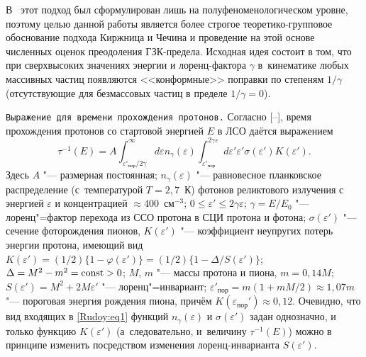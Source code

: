В~\cite{Rudoy:KIRSHNIZ} этот подход был сформулирован лишь на полуфеноменологическом уровне, поэтому целью данной работы является
более строгое теоретико-групповое обоснование подхода Киржница и Чечина \cite{Rudoy:KIRSHNIZ} и проведение на этой основе
численных оценок преодоления ГЗК-предела. Исходная идея состоит в том, что при сверхвысоких значениях энергии и лоренц-фактора
$\gamma$ в~кинематике любых массивных частиц появляются <<конформные>> поправки по степеням $1/\gamma$ (отсутствующие для
безмассовых частиц в пределе $1/\gamma=0$).

\smallskip

{\tt Выражение для времени прохождения протонов.} 
Согласно [--], время \linebreak прохождения
протонов со стартовой энергией $E$ в ЛСО даётся \mbox{выражением}
\begin{equation}
\tau^{-1}(E)=A\int^{\infty}_{\varepsilon'_{\textrm{пор}}/2\gamma} d\varepsilon n_\gamma(\varepsilon)
\int^{2\gamma\varepsilon}_{\varepsilon'_{\textrm{пор}}} d\varepsilon'\varepsilon'\sigma(\varepsilon')K(\varepsilon').
\label{Rudoy:eq1}
\end{equation}
Здесь $A$ "--- размерная постоянная; $n_\gamma(\varepsilon)$ "--- равновесное планковское распределение (с~температурой $T=2,7$~К) фотонов реликтового излучения с энергией $\varepsilon$ и концентрацией $\approx400$~см$^{-3}$;
$0\leq\varepsilon'\leq2\gamma\varepsilon$; 
$\gamma=E/E_0$ "--- лоренц"=фактор перехода из ССО протона в СЦИ протона и фотона;
$\sigma(\varepsilon')$ "--- сечение фоторождения пионов, $K(\varepsilon')$ "--- коэффициент неупругих потерь энергии протона,
имеющий вид $K(\varepsilon')=(1/2)\{1 - \varphi(\varepsilon')\}=(1/2)\{1 - \Delta/S(\varepsilon')\}$; $\Delta={M^2-m^2}=\rm{ const
}>0$; $M$, $m$ "--- массы протона и пиона, $m=0,14M$; 
$S(\varepsilon')={M^2+2M\varepsilon'}$ "--- лоренц"=инвариант; 
$\varepsilon'_{\textrm{пор}}=m(1+mM/2)\approx1,07m$ "--- пороговая энергия рождения пиона,
причём $K(\varepsilon_{\textrm{пор}}')\approx0,12$. 
Очевидно, что вид входящих в \eqref{Rudoy:eq1} функций
$n_\gamma(\varepsilon)$ и $\sigma(\varepsilon')$ задан однозначно, и только функцию $K(\varepsilon')$ (а~следовательно, и~величину $\tau^{-1}(E)$) можно в принципе изменить посредством изменения лоренц-инварианта $S(\varepsilon')$.

\smallskip

